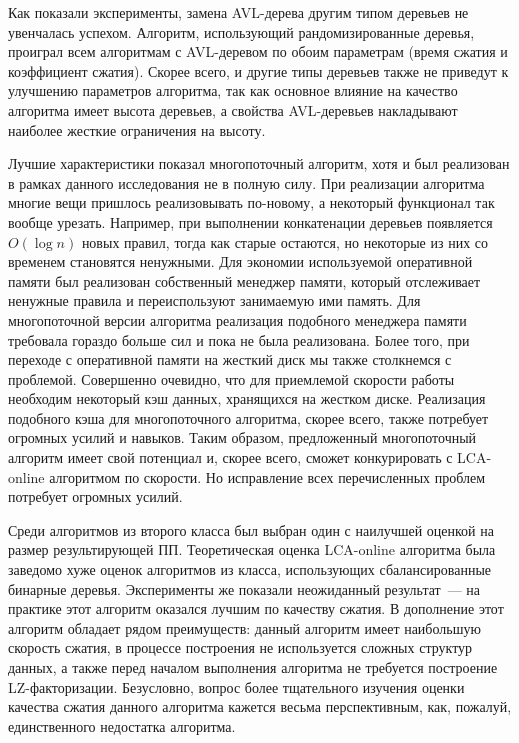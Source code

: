 \documentclass[14pt]{article}
\begin{document}
Как показали эксперименты, замена AVL-дерева другим типом деревьев не увенчалась успехом. Алгоритм, использующий рандомизированные
деревья, проиграл всем алгоритмам с AVL-деревом по обоим параметрам (время сжатия и коэффициент сжатия). Скорее всего, и другие типы
деревьев также не приведут к улучшению параметров алгоритма, так как основное влияние на качество алгоритма имеет высота деревьев,
а свойства AVL-деревьев накладывают наиболее жесткие ограничения на высоту.

Лучшие характеристики показал многопоточный алгоритм, хотя и был реализован в рамках данного исследования 
не в полную силу. При реализации алгоритма многие вещи пришлось реализовывать по-новому, а некоторый функционал
так вообще урезать. Например, при выполнении конкатенации деревьев появляется $O(\log n)$ новых правил,
тогда как старые остаются, но некоторые из них со временем становятся ненужными. Для экономии используемой
оперативной памяти был реализован собственный менеджер памяти, который отслеживает ненужные правила и переиспользуют
занимаемую ими память. Для многопоточной версии алгоритма реализация подобного менеджера памяти требовала
гораздо больше сил и пока не была реализована. Более того, при переходе с оперативной памяти на жесткий диск мы также
столкнемся с проблемой. Совершенно очевидно, что для приемлемой скорости работы необходим некоторый кэш данных,
хранящихся на жестком диске. Реализация подобного кэша для многопоточного алгоритма, скорее всего, также потребует
огромных усилий и навыков. Таким образом, предложенный многопоточный алгоритм имеет свой потенциал и, скорее всего,
сможет конкурировать с LCA-online алгоритмом по скорости. Но исправление всех перечисленных проблем потребует
огромных усилий.

Среди алгоритмов из второго класса был выбран один с наилучшей оценкой на размер результирующей ПП.
Теоретическая оценка LCA-online алгоритма была заведомо хуже оценок алгоритмов из класса, использующих
сбалансированные бинарные деревья. Эксперименты же показали неожиданный результат~--- на практике этот алгоритм 
оказался лучшим по качеству сжатия. В дополнение этот алгоритм обладает рядом преимуществ: данный алгоритм имеет
наибольшую скорость сжатия, в процессе построения не используется сложных структур данных, а также перед началом
выполнения алгоритма не требуется построение LZ-факторизации. Безусловно, вопрос более тщательного изучения оценки
качества сжатия данного алгоритма кажется весьма перспективным, как, пожалуй, единственного недостатка алгоритма.
\end{document}
